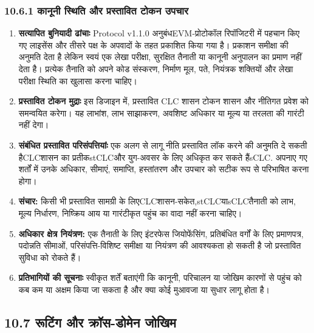 \documentclass[11pt]{article}
\begin{document}
\subsubsection*{10.6.1 कानूनी स्थिति और प्रस्तावित टोकन उपचार}

\begin{enumerate}[leftmargin=*]
\item \textbf{सत्यापित बुनियादी ढांचाः} Protocol v1.1.0 अनुबंधEVM-प्रोटोकॉल रिपॉजिटरी में पहचान किए गए लाइसेंस और तीसरे पक्ष के अपवादों के तहत प्रकाशित किया गया है। प्रकाशन समीक्षा की अनुमति देता है लेकिन स्वयं एक लेखा परीक्षा, सुरक्षित तैनाती या कानूनी अनुपालन का प्रमाण नहीं देता है। प्रत्येक तैनाति को अपने कोड संस्करण, निर्माण मूल, पते, नियंत्रक शक्तियों और लेखा परीक्षा स्थिति का खुलासा करना चाहिए।
\item \textbf{प्रस्तावित टोकन मुद्राः} इस डिजाइन में, प्रस्तावित CLC शासन टोकन शासन और नीतिगत प्रवेश को समन्वयित करेगा। यह लाभांश, लाभ साझाकरण, अवशिष्ट अधिकार या मूल्य या तरलता की गारंटी नहीं देगा।
\item \textbf{संबंधित प्रस्तावित परिसंपत्तियांः} एक अलग से लागू नीति प्रस्तावित लॉक करने की अनुमति दे सकती हैCLCशासन का प्रतीकstCLCऔर युग-अवसर के लिए अधिकृत कर सकते हैंsCLC. अपनाए गए शर्तों में उनके अधिकार, सीमाएं, समाप्ति, हस्तांतरण और उपचार को सटीक रूप से परिभाषित करना होगा।
\item \textbf{संचार:} किसी भी प्रस्तावित सामग्री के लिएCLCशासन-सकेत,stCLCयाsCLCतैनाती को लाभ, मूल्य निर्धारण, निष्क्रिय आय या गारंटीकृत पहुंच का वादा नहीं करना चाहिए।
\item \textbf{अधिकार क्षेत्र नियंत्रण:} एक तैनाती के लिए इंटरफेस जियोफेंसिंग, प्रतिबंधित वर्गों के लिए प्रमाणपत्र, पदोन्नति सीमाओं, परिसंपत्ति-विशिष्ट समीक्षा या नियंत्रण की आवश्यकता हो सकती है जो प्रस्तावित सुविधा को रोकते हैं।
\item \textbf{प्रतिभागियों की सूचनाः} स्वीकृत शर्तें बताएंगी कि कानूनी, परिचालन या जोखिम कारणों से पहुंच को कब कम या अक्षम किया जा सकता है और क्या कोई मुआवजा या सुधार लागू होता है।
\end{enumerate}
\subsection*{10.7 रूटिंग और क्रॉस-डोमेन जोखिम}
\end{document}
